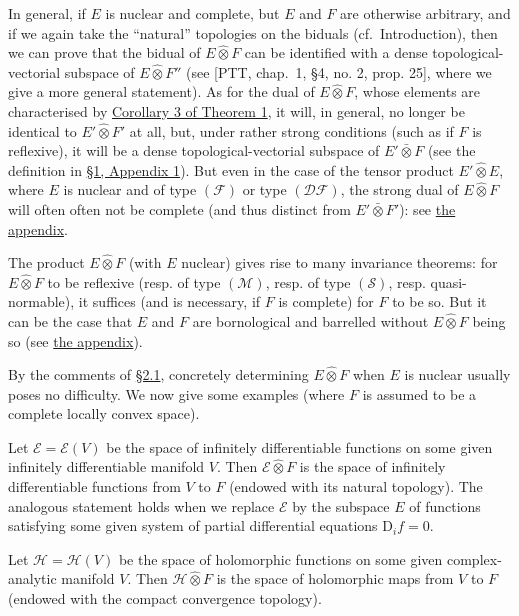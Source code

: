 \documentclass[british]{article}
\newcommand{\oldpage}[1]{\marginpar{\footnotesize$\Big\vert$ \textit{p.~#1}}}
\begin{document}
In general, if \(E\) is nuclear and complete, but \(E\) and \(F\) are
otherwise arbitrary, and if we again take the ``natural'' topologies on
the biduals (cf.~Introduction), then we can prove that the bidual of
\(E\hat{\otimes}F\) can be identified with a dense topological-vectorial
subspace of \(E\hat{\otimes}F''\) (see {[}PTT, chap.~1, §4, no. 2, prop.
25{]}, where we give a more general statement). As for the dual of
\(E\hat{\otimes}F\), whose elements are characterised by
\hyperref[section-2-corollary-3]{Corollary 3 of Theorem 1}, it will, in
general, no longer be identical to \(E'\hat{\otimes}F'\) at all, but,
under rather strong conditions (such as if \(F\) is reflexive), it will
be a dense topological-vectorial subspace of \(E'\bar{\otimes}F\) (see
the definition in \hyperref[section-1-appendix-1]{§1, Appendix 1}).
\oldpage{105} But even in the case of the tensor product
\(E'\hat{\otimes}E\), where \(E\) is nuclear and of type
\((\mathscr{F})\) or type \((\mathscr{DF})\), the strong dual of
\(E\hat{\otimes}F\) will often often not be complete (and thus distinct
from \(E'\bar{\otimes}F'\)): see \hyperref[section-2-appendix]{the
appendix}.

The product \(E\hat{\otimes}F\) (with \(E\) nuclear) gives rise to many
invariance theorems: for \(E\hat{\otimes}F\) to be reflexive (resp. of
type \((\mathscr{M})\), resp. of type \((\mathscr{S})\), resp.
quasi-normable), it suffices (and is necessary, if \(F\) is complete)
for \(F\) to be so. But it can be the case that \(E\) and \(F\) are
bornological and barrelled without \(E\hat{\otimes}F\) being so (see
\hyperref[section-2-appendix]{the appendix}).

By the comments of \hyperref[section-2.1]{§2.1}, concretely determining
\(E\hat{\otimes}F\) when \(E\) is nuclear usually poses no difficulty.
We now give some examples (where \(F\) is assumed to be a complete
locally convex space).

Let \(\mathscr{E}=\mathscr{E}(V)\) be the space of infinitely
differentiable functions on some given infinitely differentiable
manifold \(V\). Then \(\mathscr{E}\hat{\otimes}F\) is the space of
infinitely differentiable functions from \(V\) to \(F\) (endowed with
its natural topology). The analogous statement holds when we replace
\(\mathscr{E}\) by the subspace \(E\) of functions satisfying some given
system of partial differential equations \(\mathrm{D}_if=0\).

Let \(\mathscr{H}=\mathscr{H}(V)\) be the space of holomorphic functions
on some given complex-analytic manifold \(V\). Then
\(\mathscr{H}\hat{\otimes}F\) is the space of holomorphic maps from
\(V\) to \(F\) (endowed with the compact convergence topology).
\end{document}
